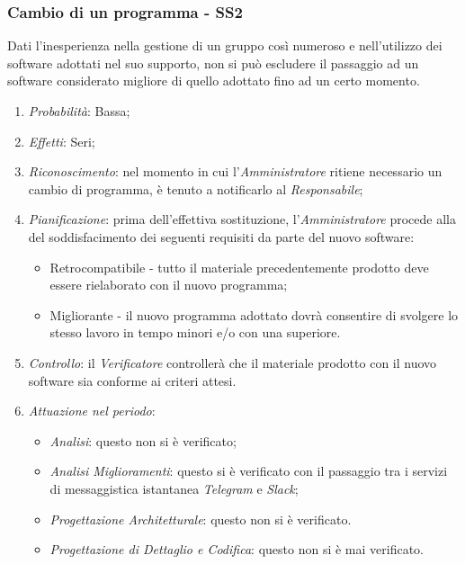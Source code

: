 \subsubsection{Cambio di un programma - SS2}
Dati l'inesperienza nella gestione di un gruppo cos\`i numeroso e nell'utilizzo dei software adottati nel suo supporto, non si pu\`o escludere il passaggio ad un software considerato migliore di quello adottato fino ad un certo momento.
\begin{enumerate}
\item \textit{Probabilit\`a}: Bassa;
\item \textit{Effetti}: Seri;
\item \textit{Riconoscimento}: nel momento in cui l'\textit{Amministratore} ritiene necessario un cambio di programma, è tenuto a notificarlo al \textit{Responsabile};
\item \textit{Pianificazione}: prima dell'effettiva sostituzione, l'\textit{Amministratore} procede alla  del soddisfacimento dei seguenti requisiti da parte del nuovo software:
  \begin{itemize}
    \item Retrocompatibile - tutto il materiale precedentemente prodotto deve essere rielaborato con il nuovo programma;
    \item Migliorante - il nuovo programma adottato dovr\`a consentire di svolgere lo stesso lavoro in tempo minori e/o con una  superiore.
  \end{itemize}
\item \textit{Controllo}: il \textit{Verificatore} controller\`a che il materiale prodotto con il nuovo software sia conforme ai criteri attesi.
\item \textit{Attuazione nel periodo}: 
	\begin{itemize}
	\item \textit{Analisi}: questo  non si è verificato;
	\item \textit{Analisi Miglioramenti}: questo  si è verificato con il passaggio tra i servizi di messaggistica istantanea \textit{Telegram} e \textit{Slack};
	\item \textit{Progettazione Architetturale}: questo  non si è verificato.
	\item \textit{Progettazione di Dettaglio e Codifica}: questo  non si è mai verificato.
	\end{itemize}
\end{enumerate}

